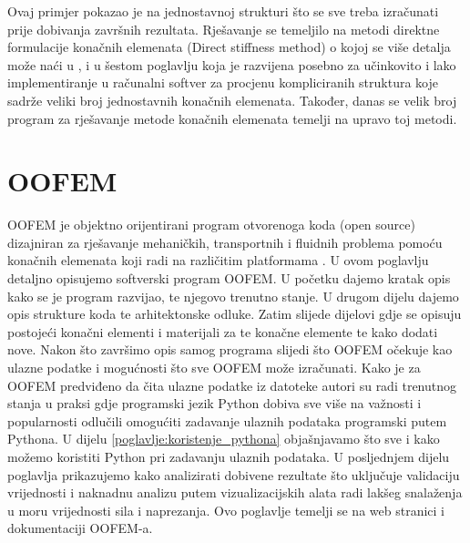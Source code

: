 \documentclass[a4paper,twoside,12pt]{memoir} %
\begin{document}
Ovaj primjer pokazao je na jednostavnoj strukturi što se sve treba izračunati prije dobivanja završnih rezultata. Rješavanje se temeljilo na metodi direktne formulacije konačnih elemenata (Direct stiffness method) o kojoj se više detalja može naći u \cite{direct_stiffness_method_article}, \cite{direct_stiffness_method} i u šestom poglavlju \cite{jurica_soric} koja je razvijena posebno za učinkovito i lako implementiranje u računalni softver za procjenu kompliciranih struktura koje sadrže veliki broj jednostavnih konačnih elemenata. Također, danas se velik broj program za rješavanje metode konačnih elemenata temelji na upravo toj metodi.



\chapter{OOFEM}	
OOFEM je objektno orijentirani program otvorenoga koda (open source) dizajniran za rješavanje mehaničkih, transportnih i fluidnih problema pomoću konačnih elemenata koji radi na različitim platformama \cite{oofem-web}. U ovom poglavlju detaljno opisujemo softverski program OOFEM. U početku dajemo kratak opis kako se je program razvijao, te njegovo trenutno stanje. U drugom dijelu dajemo opis strukture koda te arhitektonske odluke. Zatim slijede dijelovi gdje se opisuju postojeći konačni elementi i materijali za te konačne elemente te kako dodati nove. Nakon što završimo opis samog programa slijedi što OOFEM očekuje kao ulazne podatke i mogućnosti što sve OOFEM može izračunati. Kako je za OOFEM predviđeno da čita ulazne podatke iz datoteke autori su radi trenutnog stanja u praksi gdje programski jezik Python dobiva sve više na važnosti i popularnosti odlučili omogućiti zadavanje ulaznih podataka programski putem Pythona. U dijelu \ref{poglavlje:koristenje_pythona} objašnjavamo što sve i kako možemo koristiti Python pri zadavanju ulaznih podataka. U posljednjem dijelu poglavlja prikazujemo kako analizirati dobivene rezultate što uključuje validaciju vrijednosti i naknadnu analizu putem vizualizacijskih alata radi lakšeg snalaženja u moru vrijednosti sila i naprezanja. Ovo poglavlje temelji se na web stranici i dokumentaciji OOFEM-a. \cite{oofem_article} \cite{oofem-web}
\end{document}
